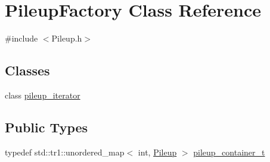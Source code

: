 \hypertarget{class_pileup_factory}{
\section{PileupFactory Class Reference}
\label{class_pileup_factory}
}


{\ttfamily \#include $<$Pileup.h$>$}

\subsection*{Classes}
\begin{DoxyCompactItemize}
\item 
class \hyperlink{class_pileup_factory_1_1pileup__iterator}{pileup\_\-iterator}
\end{DoxyCompactItemize}
\subsection*{Public Types}
\begin{DoxyCompactItemize}
\item 
typedef std::tr1::unordered\_\-map$<$ int, \hyperlink{class_pileup}{Pileup} $>$ \hyperlink{class_pileup_factory_ae4c0b96c035216ba005467e2d5fc3397}{pileup\_\-container\_\-t}
\end{DoxyCompactItemize}
